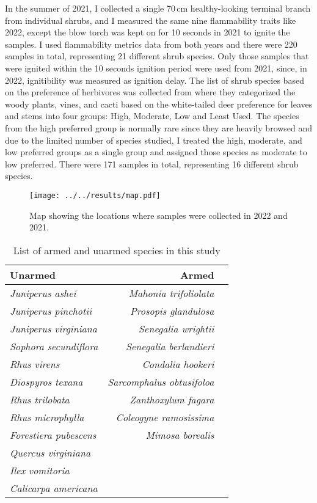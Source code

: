 \documentclass{ttuthes2007}
\begin{document}
In the summer of 2021, I collected a single 70\,cm healthy-looking terminal branch from individual shrubs, and I measured the same nine flammability traits like 2022, except the blow torch was kept on for 10 seconds in 2021 to ignite the samples.  I used flammability metrics data from both years and there were 220 samples in total, representing 21 different shrub species. Only those samples that were ignited within the 10 seconds ignition period were used from 2021, since, in 2022, ignitibility was measured as ignition delay. The list of shrub species based on the preference of herbivores was collected from \citep{wright2003white} where they categorized the woody plants, vines, and cacti based on the white-tailed deer preference for leaves and stems  into four groups: High, Moderate, Low and Least Used. The species from the high preferred group is normally rare since they are heavily browsed and due to the limited number of species studied, I treated the high, moderate, and low preferred groups as a single group and assigned those species as moderate to low preferred. There were 171 samples in total, representing 16 different shrub species.\\

 \begin{figure}
     \centering
     \texttt{[image: ../../results/map.pdf]}
    
     \caption{Map showing the locations where samples were collected in 2022 and 2021.}
 \end{figure}

\begin{table}
    \centering
    \begin{tabular}{lrr}
          Unarmed &  Armed \\
          \hline
          \emph{Juniperus ashei} & \emph{Mahonia trifoliolata}\\
          \emph{Juniperus pinchotii} & \emph{Prosopis glandulosa}\\
          \emph{Juniperus virginiana} & \emph{Senegalia wrightii}\\
          \emph{Sophora secundiflora} & \emph{Senegalia berlandieri}\\
          \emph{Rhus virens} & \emph{Condalia hookeri}\\
          \emph{Diospyros texana} & \emph{Sarcomphalus obtusifoloa}\\
          \emph{Rhus trilobata} & \emph{Zanthoxylum fagara}\\
          \emph{Rhus microphylla} & \emph{Coleogyne ramosissima}\\
          \emph{Forestiera pubescens} & \emph{Mimosa borealis}\\
          \emph{Quercus virginiana} &   \\
          \emph{Ilex vomitoria} &    \\
          \emph{Calicarpa americana} & \\
    \end{tabular}
    \caption{List of armed and unarmed species in this study}
\end{table} 
\end{document}
